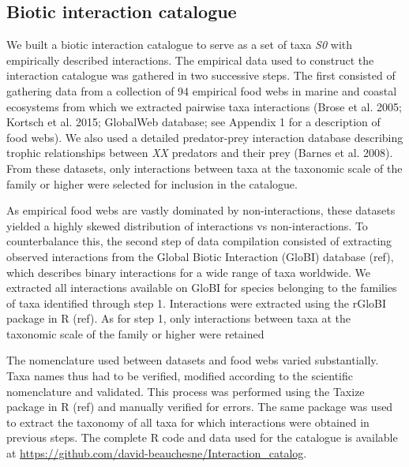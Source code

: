 \documentclass[letterpaper]{article}
\begin{document}
 \subsection{Biotic interaction catalogue}

We built a biotic interaction catalogue to serve as a set of taxa \textit{S0} with empirically described interactions. The empirical data used to construct the interaction catalogue was gathered in two successive steps. The first consisted of gathering data from a collection of 94 empirical food webs in marine and coastal ecosystems from which we extracted pairwise taxa interactions (Brose et al. 2005; Kortsch et al. 2015; GlobalWeb database; see Appendix 1 for a description of food webs). We also used a detailed predator-prey interaction database describing trophic relationships between \textit{XX} predators and their prey (Barnes et al. 2008). From these datasets, only interactions between taxa at the taxonomic scale of the family or higher were selected for inclusion in the catalogue.

As empirical food webs are vastly dominated by non-interactions, these datasets yielded a highly skewed distribution of interactions vs non-interactions. To counterbalance this, the second step of data compilation consisted of extracting observed interactions from the Global Biotic Interaction (GloBI) database (ref), which describes binary interactions for a wide range of taxa worldwide. We extracted all interactions available on GloBI for species belonging to the families of taxa identified through step 1. Interactions were extracted using the rGloBI package in R (ref). As for step 1, only interactions between taxa at the taxonomic scale of the family or higher were retained

The nomenclature used between datasets and food webs varied substantially. Taxa names thus had to be verified, modified according to the scientific nomenclature and validated. This process was performed using the Taxize package in R (ref) and manually verified for errors. The same package was used to extract the taxonomy of all taxa for which interactions were obtained in previous steps. The complete R code and data used for the catalogue is available at \href{https://github.com/david-beauchesne/Interaction_catalog}{https://github.com/david-beauchesne/Interaction\_catalog}.
\end{document}
